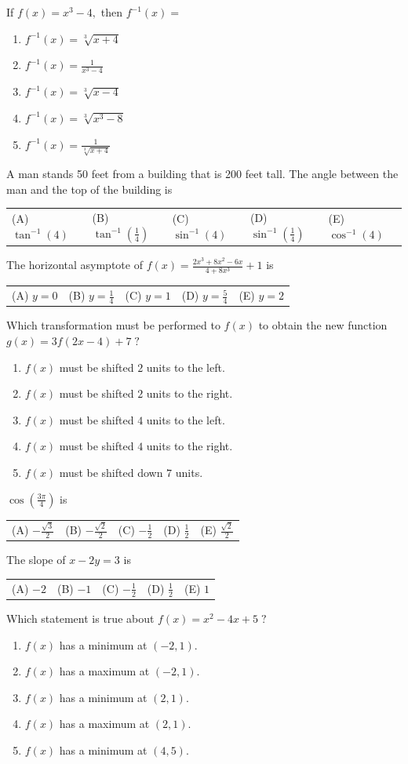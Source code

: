 \documentclass[letterstyle,12pt]{extarticle}
\newcounter{qcounter}
\newcommand{\choices}[5]{
\vspace{0.8em} 
\begin{enumerate}[label=(\Alph*)]
\setlength\itemsep{1em} 
\item
#1 
\item 
#2
\item
#3
\item
#4
\item
#5
\end{enumerate}
}
\newcommand{\choicesline}[5]{    
\vspace{2em} \break 
\begin{tabularx}{0.95 \textwidth} { 
>{\arraybackslash}X 
>{\arraybackslash}X 
>{\arraybackslash}X 
>{\arraybackslash}X 
>{\arraybackslash}X }
(A) \; #1
& 
(B) \; #2
& 
(C) \; #3
& 
(D) \; #4
&
(E) \; #5 
\end{tabularx}
\vspace{2em} \break
}
\newcommand{\ans}[1]{{\color{black} #1}}
\newenvironment{question}
    {\begin{minipage}{0.9 \textwidth}
        \item
    }
    { 
    \end{minipage} \vspace{4ex}
    }
\begin{document}
\begin{list}{\textbf{.}~}{}
\begin{question}
If \(f(x) = x^3 - 4,\) then \(f^{-1}(x) =\)
\choices
{\ans{\(f^{-1}(x) = \sqrt[3]{x + 4}\)}}
{\(f^{-1}(x) = \frac{1}{x^3 - 4}\)}
{\(f^{-1}(x) = \sqrt[3]{x - 4}\)}
{\(f^{-1}(x) = \sqrt[3]{x^3 - 8}\)}
{\(f^{-1}(x) = \frac{1}{\sqrt[3]{x + 4}}\)}
\end{question}

\begin{question}
A man stands 50 feet from a building that is 200 feet tall. The angle between the man and the top of the building is \\
\choicesline
{\ans{\(\tan^{-1}(4)\)}}
{\(\tan^{-1} \left(\frac{1}{4}\right)\)}
{\(\sin^{-1}(4)\)}
{\(\sin^{-1} \left(\frac{1}{4}\right)\)}
{\(\cos^{-1}(4)\)}
\end{question}

\begin{question}
The horizontal asymptote of \(f(x) = \frac{2x^3 + 8x^2 - 6x}{4 + 8x^3} + 1\) is \\
\choicesline
{\(y = 0\)}
{\(y = \frac{1}{4}\)}
{\(y = 1\)}
{\ans{\(y = \frac{5}{4}\)}}
{\(y = 2\)}
\end{question}

\begin{question} 
Which transformation must be performed to \(f(x)\) to obtain the new function \(g(x) = 3f(2x - 4) + 7 \; ?\)
\choices
{\(f(x)\) must be shifted \(2\) units to the left.}
{\ans{\(f(x)\) must be shifted \(2\) units to the right.}}
{\(f(x)\) must be shifted \(4\) units to the left.}
{\(f(x)\) must be shifted \(4\) units to the right.}
{\(f(x)\) must be shifted down \(7\) units.}
\end{question}

\begin{question}
\(\cos \left(\frac{3 \pi}{4}\right)\) is 
\choicesline
{\(-\frac{\sqrt 3}{2}\)}
{\ans{\(-\frac{\sqrt 2}{2}\)}}
{\(-\frac{1}{2}\)}
{\(\frac{1}{2}\)}
{\(\frac{\sqrt 2}{2}\)}
\end{question}

\begin{question}
The slope of \(x - 2y = 3\) is \\
\choicesline
{\(-2\)}
{\(-1\)}
{\(-\frac{1}{2}\)}
{\ans{\(\frac{1}{2}\)}}
{\(1\)}
\end{question}

\begin{question}
Which statement is true about \(f(x) = x^2 - 4x + 5 \; ?\)
\choices
{\(f(x)\) has a minimum at \((-2, 1).\)}
{\(f(x)\) has a maximum at \((-2, 1).\)}
{\ans{\(f(x)\) has a minimum at \((2, 1).\)}}
{\(f(x)\) has a maximum at \((2, 1).\)}
{\(f(x)\) has a minimum at \((4, 5).\)}
\end{question}


\end{list}
\end{document}
